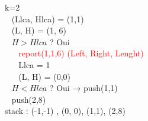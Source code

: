\documentclass[10pt]{beamer}
\begin{document}
\begin{frame}
\begin{columns}
    k=2\\
    ~ (Llca, Hlca) = (1,1)\\
    ~ (L, H) = (1, 6)\\
    ~ $H > Hlca$ ? Oui\\
    ~ ~ \textcolor{red}{report(1,1,6) (Left, Right, Lenght)}\\
    ~ ~ Llca = 1\\
    ~ ~ (L, H) = (0,0)\\
    ~ $H < Hlca$ ? Oui → push(1,1)\\
    ~ push(2,8)\\
    stack : (-1,-1) , (0, 0), (1,1), (2,8)\\


  \end{columns}

\end{frame}
\end{document}
